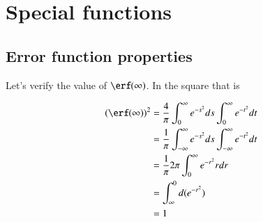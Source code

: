 \label{chap:appendix:specialFunctions}
\chapter{Special functions}
\section{Error function properties}

Let's verify the value of $\erf(\infty)$.  In the square that is

\begin{align*}
(\erf(\infty))^2 
&=
\frac{4}{\pi} 
\int_0^\infty e^{-s^2} ds
\int_0^\infty e^{-t^2} dt \\
&=
\frac{1}{\pi} 
\int_{-\infty}^\infty e^{-s^2} ds
\int_{-\infty}^\infty e^{-t^2} dt \\
&=
\frac{1}{\pi} 2 \pi
\int_{0}^\infty e^{-r^2} r dr \\
&=
\int_\infty^0 d( e^{-r^2} ) \\
&= 1
\end{align*}
